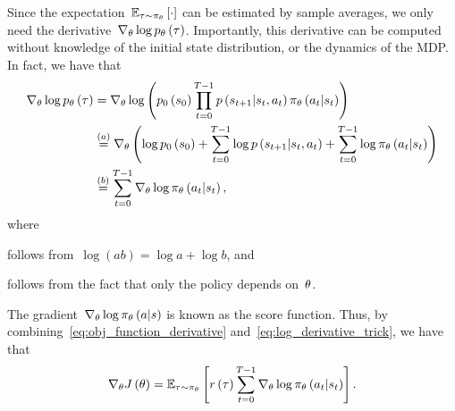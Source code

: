 Since the expectation~${\mathbb{E}_{\tau\sim\pi_{\theta}}\left[\cdot\right]}$ can be estimated by sample averages, we only need the derivative~${\nabla_{\theta}\log p_{\theta}\left(\tau\right)}$. Importantly, this derivative can be computed without knowledge of the initial state distribution, or the dynamics of the MDP. In fact, we have that
\begin{align} \label{eq:log_derivative_trick}
	\nabla_{\theta}\log p_{\theta}\left(\tau\right)
		&=\nabla_{\theta}\log\left(p_{0}\left(s_{0}\right)\prod_{t=0}^{T-1}p\left(s_{t+1}\middle\vert s_{t},a_{t}\right)\pi_{\theta}\left(a_{t}\middle\vert s_{t}\right)\right) \notag \\
		&\overset{(a)}{=}\nabla_{\theta}\left(\log p_{0}\left(s_{0}\right)+\sum_{t=0}^{T-1}\log p\left(s_{t+1}\middle\vert s_{t},a_{t}\right)+\sum_{t=0}^{T-1}\log\pi_{\theta}\left(a_{t}\middle\vert s_{t}\right)\right) \notag \\
		&\overset{(b)}{=}\sum_{t=0}^{T-1}\nabla_{\theta}\log\pi_{\theta}\left(a_{t}\middle\vert s_{t}\right),
\end{align}
where
\begin{enumerate*}[label=(\alph*)]
	\item follows from~${\log\left(ab\right)=\log{a}+\log{b}}$, and
	\item follows from the fact that only the policy depends on~${\theta}$.
\end{enumerate*}
The gradient~${\nabla_{\policyparameter}\log\policy_{\policyparameter}\left(\action\middle\vert\state\right)}$ is known as the score function. Thus, by combining~\eqref{eq:obj_function_derivative} and~\eqref{eq:log_derivative_trick}, we have that
\begin{equation}
	\nabla_{\theta}J\left(\theta\right)=\mathbb{E}_{\tau\sim\pi_{\theta}}\left[r\left(\tau\right)\sum_{t=0}^{T-1}\nabla_{\theta}\log\pi_{\theta}\left(a_{t}\middle\vert s_{t}\right)\right].
\end{equation}

